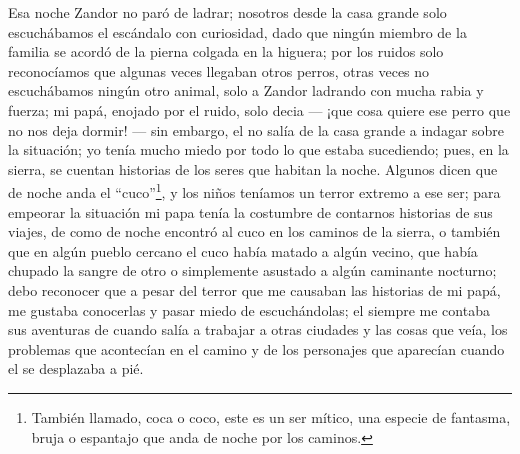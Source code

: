Esa noche Zandor no paró de ladrar; nosotros desde la casa grande solo escuchábamos el escándalo con curiosidad, dado que ningún miembro de la familia se acordó de la pierna colgada en la higuera; por los ruidos solo reconocíamos que algunas veces llegaban otros perros, otras veces no escuchábamos ningún otro animal, solo a Zandor ladrando con mucha rabia y fuerza; mi papá, enojado por el ruido, solo decia --- ¡que cosa quiere ese perro que no nos deja dormir! --- sin embargo, el no salía de la casa grande a indagar sobre la situación; yo tenía mucho miedo por todo lo que estaba sucediendo; pues, en la sierra, se cuentan historias de los seres que habitan la noche.
Algunos dicen que de noche anda el ``cuco''\footnote{También llamado, coca o coco, este es un ser mítico, una especie de fantasma, bruja o espantajo que anda de noche por los caminos.}, y los niños teníamos un terror extremo a ese ser; para empeorar la situación mi papa tenía la costumbre de contarnos historias de sus viajes, de como de noche encontró al cuco en los caminos de la sierra, o también que en algún pueblo cercano el cuco había matado a algún vecino, que había chupado la sangre de otro o simplemente asustado a algún caminante nocturno; debo reconocer que a pesar del terror que me causaban las historias de mi papá, me gustaba conocerlas y pasar miedo de escuchándolas; el siempre me contaba sus aventuras de cuando salía a trabajar a otras ciudades y las cosas que veía, los problemas que acontecían en el camino y de los personajes que aparecían cuando el se desplazaba a pié.

